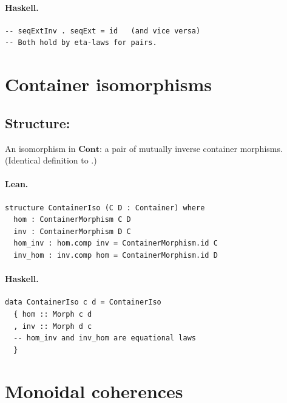 \documentclass[11pt,a4paper]{article}
\begin{document}
\paragraph{Haskell.}
\begin{lstlisting}[style=haskell]
-- seqExtInv . seqExt = id   (and vice versa)
-- Both hold by eta-laws for pairs.
\end{lstlisting}

\section{Container isomorphisms}

\subsection{Structure: }

\begin{defn}
An isomorphism in $\mathbf{Cont}$: a pair of mutually inverse container
morphisms.  (Identical definition to .)
\end{defn}

\paragraph{Lean.}
\begin{lstlisting}[style=lean]
structure ContainerIso (C D : Container) where
  hom : ContainerMorphism C D
  inv : ContainerMorphism D C
  hom_inv : hom.comp inv = ContainerMorphism.id C
  inv_hom : inv.comp hom = ContainerMorphism.id D
\end{lstlisting}

\paragraph{Haskell.}
\begin{lstlisting}[style=haskell]
data ContainerIso c d = ContainerIso
  { hom :: Morph c d
  , inv :: Morph d c
  -- hom_inv and inv_hom are equational laws
  }
\end{lstlisting}

\section{Monoidal coherences}
\end{document}
